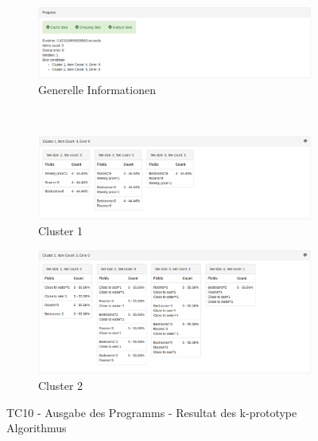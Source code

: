 \begin{figure}[H]
	\begin{subfigure}[t]{1\textwidth}
		\centering
		\includegraphics[width=1\textwidth]{images/tc10-kprototype-1}
		\caption{Generelle Informationen}
		\label{fig:testingfazit:testing:testcases:10-2-1}
	\end{subfigure} \\
	\begin{subfigure}[t]{1\textwidth}
		\centering
		\includegraphics[width=1\textwidth]{images/tc10-kprototype-2}
		\caption{Cluster 1}
		\label{fig:testingfazit:testing:testcases:10-2-2}
	\end{subfigure}
	\begin{subfigure}[t]{1\textwidth}
		\centering
		\includegraphics[width=1\textwidth]{images/tc10-kprototype-3}
		\caption{Cluster 2}
		\label{fig:testingfazit:testing:testcases:10-2-3}
	\end{subfigure}
	\caption{TC10 - Ausgabe des Programms - Resultat des k-prototype Algorithmus}
	\label{fig:testingfazit:testing:testcases:10-2}
\end{figure}
